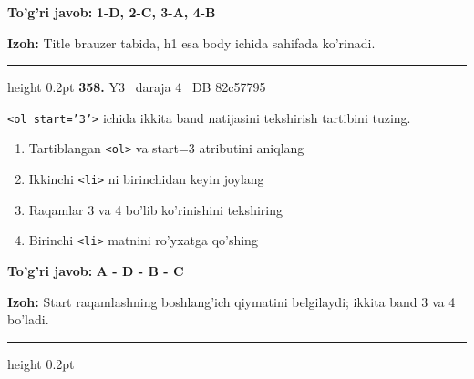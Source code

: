 \documentclass[10pt,a4paper,oneside]{article}
\begin{document}
\begin{tcolorbox}[enhanced,breakable,colback=teal!4,colframe=teal!45!black,boxrule=0.45pt,arc=1.2mm,left=2.8mm,right=2.8mm,top=2mm,bottom=2mm,before skip=2mm,after skip=2mm]
\textbf{\color{teal}To'g'ri javob:} \textbf{1-D, 2-C, 3-A, 4-B}
\par\smallskip
\textbf{Izoh:} Title brauzer tabida, h1 esa body ichida sahifada ko'rinadi.
\end{tcolorbox}
\vspace{2mm}\hrule height 0.2pt \vspace{4mm}
\hypertarget{q358}{\textbf{\color{ink}358.}}  {\color{muted}\scriptsize Y3 \textbullet\ daraja 4 \textbullet\ DB 82c57795}
\par
\texttt{\textless{}ol start='3'\textgreater{}} ichida ikkita band natijasini tekshirish tartibini tuzing.
\begin{enumerate}[label=\Alph*),leftmargin=9mm]
\item Tartiblangan \texttt{\textless{}ol\textgreater{}} va start=3 atributini aniqlang
\item Ikkinchi \texttt{\textless{}li\textgreater{}} ni birinchidan keyin joylang
\item Raqamlar 3 va 4 bo'lib ko'rinishini tekshiring
\item Birinchi \texttt{\textless{}li\textgreater{}} matnini ro'yxatga qo'shing
\end{enumerate}
\begin{tcolorbox}[enhanced,breakable,colback=teal!4,colframe=teal!45!black,boxrule=0.45pt,arc=1.2mm,left=2.8mm,right=2.8mm,top=2mm,bottom=2mm,before skip=2mm,after skip=2mm]
\textbf{\color{teal}To'g'ri javob:} \textbf{A - D - B - C}
\par\smallskip
\textbf{Izoh:} Start raqamlashning boshlang'ich qiymatini belgilaydi; ikkita band 3 va 4 bo'ladi.
\end{tcolorbox}
\vspace{2mm}\hrule height 0.2pt \vspace{4mm}
\end{document}
